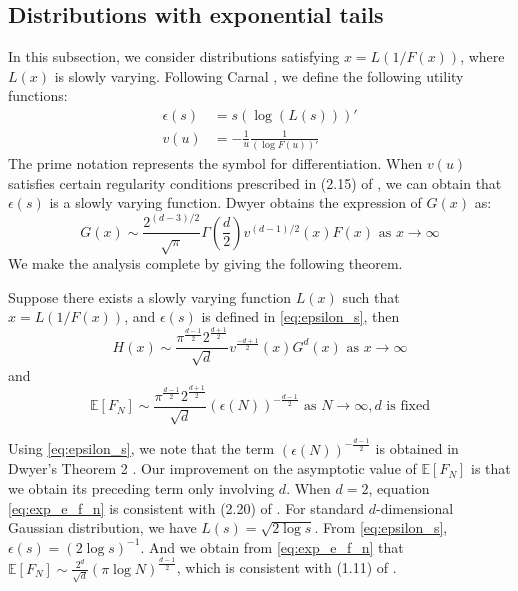 \documentclass{aptpub}
\def\E{\mathbb{E}}
\begin{document}
\subsection{Distributions with exponential tails}
In this subsection, we consider distributions satisfying
$x = L(1/F(x)) $, where $L(x)$ is slowly varying. Following Carnal \cite{carnal1970konvexe},
we define the following utility functions:
\begin{align}
     \epsilon(s) & = s (\log (L(s)))' \label{eq:epsilon_s}\\
     v(u) &= -\frac{1}{u} \frac{1}{(\log F(u))'}    
\end{align}
The prime notation represents the symbol for differentiation. When $v(u)$ satisfies
certain regularity conditions prescribed in (2.15) of \cite{carnal1970konvexe},
we can obtain that $\epsilon(s)$ is a slowly varying function.
Dwyer \cite{dwyer1991convex} obtains the expression of $G(x)$ as:
\begin{equation}\label{eq:G_x_exp}
     G(x) \sim \frac{2^{(d-3)/2}}{\sqrt{\pi}}\Gamma\left(\frac{d}{2}\right)
     v^{(d-1)/2}(x) F(x)
      \textrm{ as } x\to \infty
\end{equation}
We make the analysis complete by giving the following theorem.
\begin{theorem}\label{thm:exponential_tails}
     Suppose there exists a slowly
     varying function $L(x)$ such that \linebreak $x=L(1/F(x))$,
     and $\epsilon(s)$ is defined in \eqref{eq:epsilon_s}, then
\begin{equation}\label{eq:H_x_exp}
     H(x) \sim \frac{\pi^{\frac{d-1}{2}} 2^{\frac{d+1}{2}}}{\sqrt{d}}v^{\frac{-d+1}{2}}(x)G^d(x)
     \textrm{ as } x\to \infty
\end{equation}
 and
 \begin{equation}\label{eq:exp_e_f_n}
     \E[F_N]\sim \frac{\pi^{\frac{d-1}{2}} 2^{\frac{d+1}{2}}}{\sqrt{d}} (\epsilon(N))^{-\frac{d-1}{2}}
     \textrm{ as } N \to \infty, d \textrm { is fixed}
 \end{equation}
\end{theorem}
 Using \eqref{eq:epsilon_s}, we note that the term
 $(\epsilon(N))^{-\frac{d-1}{2}}$
 is obtained in Dwyer's Theorem 2 \cite{dwyer1991convex}.
 Our improvement on the asymptotic value of $\E[F_N]$ is that we obtain its preceding term only involving $d$.
 When $d=2$, equation \eqref{eq:exp_e_f_n} is consistent with (2.20) of \cite{carnal1970konvexe}.
 For standard $d$-dimensional Gaussian distribution, we have $L(s)=\sqrt{2\log s}$.
 From \eqref{eq:epsilon_s}, $\epsilon(s) = (2\log s)^{-1}$. And we obtain from \eqref{eq:exp_e_f_n}
 that $\E[F_N]\sim \frac{2^d}{\sqrt{d}}(\pi \log N)^{\frac{d-1}{2}}$,
 which is consistent with (1.11) of \cite{raynaud1970enveloppe}.
\end{document}
